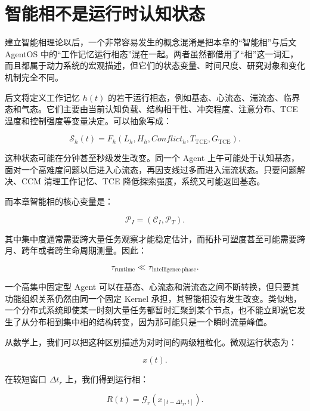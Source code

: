 \section{智能相不是运行时认知状态}
\label{sec:phase_not_runtime_state}

建立智能相理论以后，一个非常容易发生的概念混淆是把本章的“智能相”与后文 AgentOS 中的“工作记忆运行相态”混在一起。两者虽然都借用了“相”这一词汇，而且都属于动力系统的宏观描述，但它们的状态变量、时间尺度、研究对象和变化机制完全不同。

后文将定义工作记忆 $h(t)$ 的若干运行相态，例如基态、心流态、湍流态、临界态和气态。它们主要由当前认知负载、结构相干性、冲突程度、注意分布、TCE 温度和控制强度等变量决定。可以抽象写成：

\begin{equation}
\mathcal{S}_{h}(t)
=
F_h
\left(
L_h,
H_h,
Conflict_h,
T_{\mathrm{TCE}},
G_{\mathrm{TCE}}
\right).
\end{equation}

这种状态可能在分钟甚至秒级发生改变。同一个 Agent 上午可能处于认知基态，面对一个高难度问题以后进入心流态，再因支线过多而进入湍流状态。只要问题解决、CCM 清理工作记忆、TCE 降低探索强度，系统又可能返回基态。

而本章智能相的核心变量是：

\begin{equation}
\mathcal{P}_{I}
=
\left(
\mathcal{C}_{I},
\mathcal{P}_{T}
\right).
\end{equation}

其中集中度通常需要跨大量任务观察才能稳定估计，而拓扑可塑度甚至可能需要跨月、跨年或者跨生命周期测量。因此：

\begin{equation}
\tau_{\mathrm{runtime}}
\ll
\tau_{\mathrm{intelligence\ phase}}.
\end{equation}

一个高集中固定型 Agent 可以在基态、心流态和湍流态之间不断转换，但只要其功能组织关系仍然由同一个固定 Kernel 承担，其智能相没有发生改变。类似地，一个分布式系统即使某一时刻大量任务都暂时汇聚到某个节点，也不能立即说它发生了从分布相到集中相的结构转变，因为那可能只是一个瞬时流量峰值。

从数学上，我们可以把这种区别描述为对时间的两级粗粒化。微观运行状态为：

\begin{equation}
x(t).
\end{equation}

在较短窗口 $\Delta t_r$ 上，我们得到运行相：

\begin{equation}
R(t)
=
\mathcal{G}_r
\left(
x_{[t-\Delta t_r,t]}
\right).
\end{equation}

